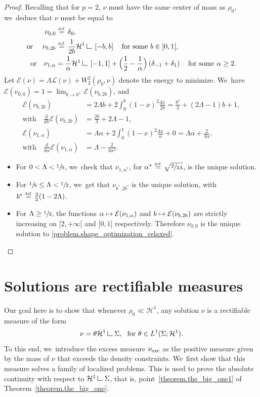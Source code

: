 \documentclass[10pt]{amsart}
\newcommand\mto{\mathchoice{\longmapsto}{\mapsto}{\mapsto}{\mapsto}}
\theoremstyle{definition}
\newcommand{\eqdef}{\ensuremath{\stackrel{\mbox{\upshape\tiny def.}}{=}}}
\newcommand\LM[1]{\hbox{\vrule width.5pt \vbox to#1pt{\vfill \hrule width#1pt height.5pt}}}
\newcommand\LL{{\mathchoice {\>\LM7\>}{\>\LM7\>}{\,\LM5\,}{\,\LM{3.35}\,}}}
\newcommand{\mres}{\LL}
\newcommand\E{\mathcal{E}}
\newcommand\cH{\mathcal{H}}
\newcommand\cL{\mathcal{L}}
\newcommand{\nuexc}{\nu_{\textup{exc}}}
\newcommand\dd{\mathrm{d}}
\newcommand{\oi}[2]{ \left] #1, #2 \right[ }
\newcommand{\ci}[2]{ \left[ #1, #2 \right] }
\begin{document}
\begin{proof}
Recalling that for $p=2$, $\nu$ must have the same center of mass as $\rho_0$, we~deduce that $\nu$ must be equal to
\begin{align*}
\nu_{0,0} &\eqdef\delta_0,\\
\mbox{or }\quad
\nu_{b,2b}&\eqdef \frac{1}{2b}\cH^1\mres\ci{-b}{b}\quad\mbox{for some $b \in \oi{0}{1}$},\\
\mbox{or}\quad \nu_{1,\alpha} &= \frac{1}{\alpha}\cH^1\mres\ci{-1}{1} + \Bigl(\frac{1}{2}-\frac{1}{\alpha}\Bigr)\left(\delta_{-1}+\delta_{1}\right)\quad \mbox{for some $\alpha\geq 2$.}
\end{align*}
Let $\E(\nu)= \Lambda \cL(\nu)+W_2^2(\rho_0,\nu)$ denote the energy to minimize. We~have $\E(\nu_{0,0})=1 = \lim_{b \to 0^+} \E(\nu_{b,2b})$, and
\begin{align*}
\E(\nu_{b,2b})&= 2\Lambda b + 2 \int_0^b (1-x)^2\frac{\dd x}{2b} = \frac{b^2}{3}+ (2\Lambda-1)b+1,\\
\mbox{with}\quad \frac{\dd}{\dd b}\E(\nu_{b,2b}) &= \frac{2b}{3}+2\Lambda-1,\\
\E(\nu_{1,\alpha})&= \Lambda \alpha + 2\int_0^1(1-x)^2\frac{\dd x}{\alpha}+0 = \Lambda \alpha +\frac{2}{3\alpha},\\
\mbox{with}\quad \frac{\dd}{\dd \alpha}\E(\nu_{1,\alpha}) &= \Lambda - \frac{2}{3\alpha^2}.
\end{align*}

\begin{itemize}
\item
For $0<\Lambda<\sfrac{1}{6}$, we~check that $\nu_{1,\alpha^*}$, for $\alpha^*\eqdef \sqrt{\sfrac{2}{3\Lambda}}$, is the unique solution.

\item
For $\sfrac{1}{6}\le \Lambda < \sfrac{1}{2}$, we~get that $\nu_{b^*,2b^*}$ is the unique solution, with $b^*\eqdef \frac{3}{2}(1-2\Lambda)$.

\item
For $\Lambda \geq \sfrac{1}{2}$, the functions $\alpha\mto \E(\nu_{1,\alpha})$ and $b\mto \E(\nu_{b,2b})$ are strictly increasing on $[2,+\infty[$ and $]0,1]$ respectively. Therefore $\nu_{0,0}$ is the unique solution to \eqref{problem.shape_optimization_relaxed}.\qedhere
\end{itemize}
\end{proof}

\section{Solutions are rectifiable measures}\label{section.solutions_are_absolutely_continuous}
Our goal here is to show that whenever $\rho_0 \ll \cH^1$, any solution $\nu$ is a rectifiable measure
of the form
\[
\nu = \theta \cH^1\mres \Sigma, \ \text{ for $\theta \in L^1(\Sigma; \cH^1)$}.
\]
To this end, we~introduce the excess measure $\nuexc$ as the positive measure given by the mass of $\nu$ that exceeds the density constraints. We~first show that this measure solves a family of localized problems. This is used to prove the absolute continuity with respect to $\cH^1\mres\Sigma$, that is, point~\eqref{theorem.the_big_one1} of Theorem~\ref{theorem.the_big_one}.
\end{document}
